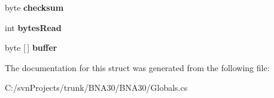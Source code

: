 \begin{DoxyCompactItemize}
\item 
\mbox{\label{struct_b_n_a30_1_1_globals2_1_1_raveon_diag_struct_ad9daed82f7708035a98750dacc25a674}} 
byte {\bfseries checksum}
\item 
\mbox{\label{struct_b_n_a30_1_1_globals2_1_1_raveon_diag_struct_a811c886bc3ff921286486e41a71dc5a1}} 
int {\bfseries bytes\+Read}
\item 
\mbox{\label{struct_b_n_a30_1_1_globals2_1_1_raveon_diag_struct_a3ac1737bd4897ade47fa0fe5b63c90f7}} 
byte \mbox{[}$\,$\mbox{]} {\bfseries buffer}
\end{DoxyCompactItemize}


The documentation for this struct was generated from the following file\+:\begin{DoxyCompactItemize}
\item 
C\+:/svn\+Projects/trunk/\+B\+N\+A30/\+B\+N\+A30/Globals.\+cs\end{DoxyCompactItemize}
